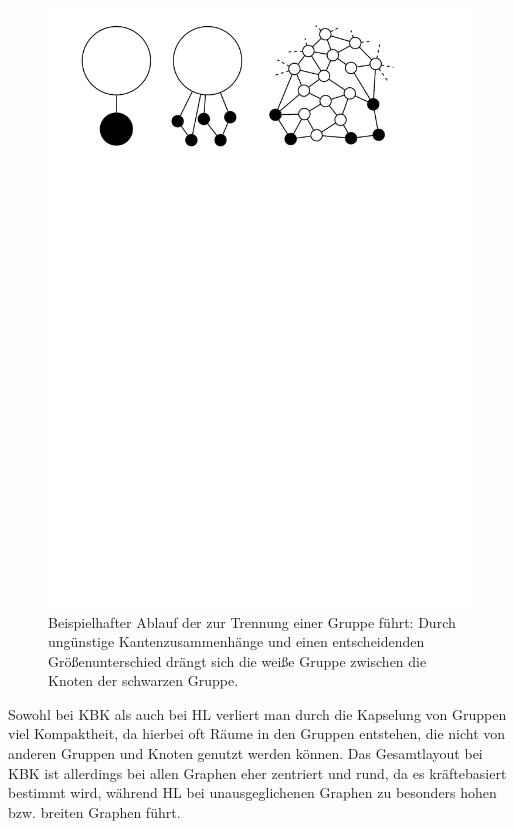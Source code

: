 \begin{figure}[h]
\begin{center}
	\includegraphics[width=\textwidth]{Pics/uniform_trenn.pdf}
	\caption{Beispielhafter Ablauf der zur Trennung einer Gruppe führt: Durch ungünstige Kantenzusammenhänge und einen entscheidenden Größenunterschied drängt sich die weiße Gruppe zwischen die Knoten der schwarzen Gruppe.}
	\label{Uniform-Trenn-Skizze}
\end{center}
\end{figure}


Sowohl bei KBK als auch bei HL verliert man durch die Kapselung von Gruppen viel Kompaktheit, da hierbei oft Räume in den Gruppen entstehen, die nicht von anderen Gruppen und Knoten genutzt werden können. Das Gesamtlayout bei KBK ist allerdings bei allen Graphen eher zentriert und rund, da es kräftebasiert bestimmt wird, während HL bei unausgeglichenen Graphen zu besonders hohen bzw. breiten Graphen führt.

